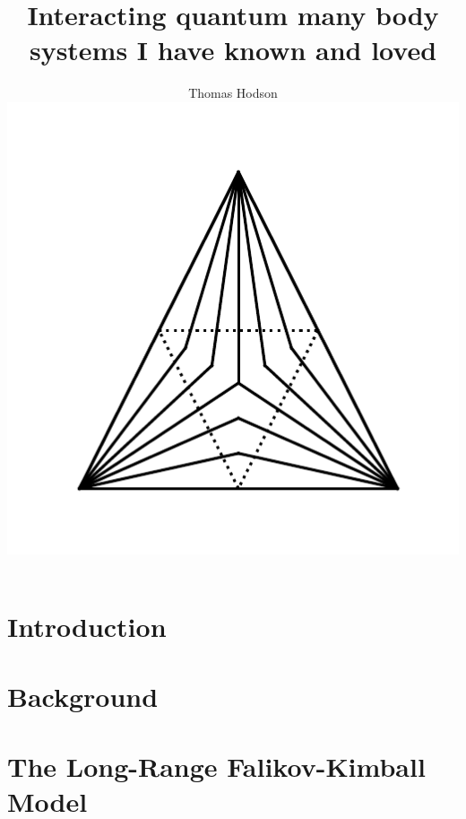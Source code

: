 \documentclass[a4paper,12pt]{report}
\begin{document}
\title{\LARGE {\bf Interacting quantum many body systems I have known and loved}\\
 \vspace*{6mm}
}

\author{Thomas Hodson\\\vspace{10mm}
\includegraphics[width=.4\textwidth,height=.4\textheight]{figure_code/logo/logo}
\vspace{-0.4\textheight}
\vspace{10mm}
}


\maketitle

\preface



% 
% 

\body
\chapter{Introduction}


\chapter{Background}




\chapter{The Long-Range Falikov-Kimball Model}
% 
% 
% 
\end{document}
